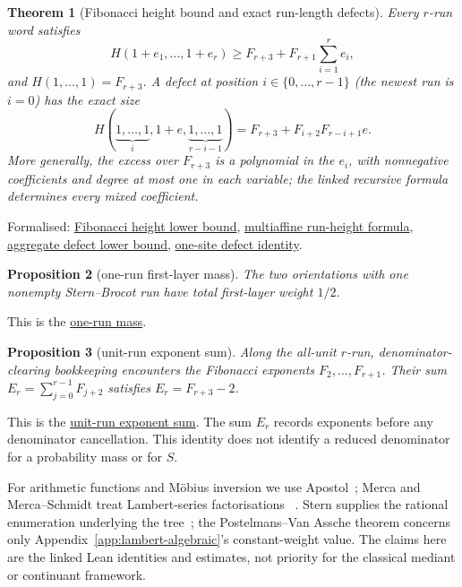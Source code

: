 \documentclass[11pt]{article}
\newcommand{\commit}{312b96c0d149ed466725c62d4ef24cfc91bca34e}
\newcommand{\repobase}{https://github.com/wcook04/plectis-lean-erdos249-257/blob/\commit}
\newcommand{\PK}{Erdos249257}
\newcommand{\lword}[4]{\href{\repobase/\PK/#1\#L#2}{#4}}
\newtheorem{theorem}{Theorem}[section]
\newtheorem{proposition}[theorem]{Proposition}
\theoremstyle{definition}
\theoremstyle{remark}
\begin{document}
{\begin{theorem}[Fibonacci height bound and exact run-length defects]
\label{res:sternbrocotruns}
Every \(r\)-run word satisfies
\[
 H(1+e_1,\ldots,1+e_r)
 \ge F_{r+3}+F_{r+1}\sum_{i=1}^r e_i,
\]
and \(H(1,\ldots,1)=F_{r+3}\).  A defect at position
\(i\in\{0,\ldots,r-1\}\) (the newest run is $i=0$) has the exact size
\[
 H(\underbrace{1,\ldots,1}_{i},1+e,
   \underbrace{1,\ldots,1}_{r-i-1})
 =F_{r+3}+F_{i+2}F_{r-i+1}e.
\]
More generally, the excess over $F_{r+3}$ is a polynomial in the $e_i$, with
nonnegative coefficients and degree at most one in each variable; the linked
recursive formula determines every mixed coefficient.
\end{theorem}
\noindent Formalised:
\lword{SternBrocotRunGeometry.lean}{185}{runHeight_fib_lower}{Fibonacci height lower bound},
\lword{SternBrocotRunGeometry.lean}{263}{runHeight_defectRunLengths}{multiaffine run-height formula},
\lword{SternBrocotRunGeometry.lean}{343}{runHeight_defect_fib_sum_lower}{aggregate defect lower bound},
\lword{SternBrocotRunGeometry.lean}{413}{runHeight_oneSiteDefect}{one-site defect identity}.

\begin{proposition}[one-run first-layer mass]\label{res:onerunmass}
The two orientations with one nonempty Stern--Brocot run have total
first-layer weight $1/2$.
\end{proposition}
\noindent This is the
\lword{SternBrocotRunGeometry.lean}{467}{oneRunMass_eq_half}{one-run mass}.

\begin{proposition}[unit-run exponent sum]\label{res:rundenominator}
Along the all-unit $r$-run, denominator-clearing bookkeeping encounters the
Fibonacci exponents $F_2,\ldots,F_{r+1}$.  Their sum
$E_r=\sum_{j=0}^{r-1}F_{j+2}$ satisfies \(E_r=F_{r+3}-2\).
\end{proposition}
\noindent This is the
\lword{SternBrocotRunGeometry.lean}{491}{naturalRunDenominatorExponent_add_two}{unit-run exponent sum}.
The sum $E_r$ records exponents before any denominator cancellation.  This
identity does not identify a reduced denominator for a probability mass or
for \(S\).

For arithmetic functions and M\"obius inversion we use Apostol~\cite{apostol};
Merca and Merca--Schmidt treat Lambert-series factorisations
~\cite{merca2017,mercaschmidt}.  Stern supplies the rational enumeration
underlying the tree~\cite{stern1858}; the Postelmans--Van Assche theorem
concerns only Appendix~\ref{app:lambert-algebraic}'s constant-weight value.
The claims here are the linked Lean identities and estimates, not priority for
the classical mediant or continuant framework.
}
\end{document}
